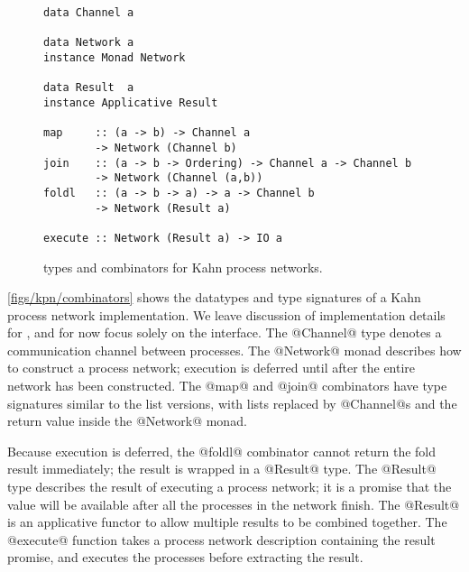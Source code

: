 \begin{figure}
\begin{lstlisting}
data Channel a

data Network a
instance Monad Network

data Result  a
instance Applicative Result

map     :: (a -> b) -> Channel a
        -> Network (Channel b)
join    :: (a -> b -> Ordering) -> Channel a -> Channel b
        -> Network (Channel (a,b))
foldl   :: (a -> b -> a) -> a -> Channel b
        -> Network (Result a)

execute :: Network (Result a) -> IO a
\end{lstlisting}
\caption[Types and combinators for Kahn process networks]{types and combinators for Kahn process networks.}
\label{figs/kpn/combinators}
\end{figure}

\autoref{figs/kpn/combinators} shows the datatypes and type signatures of a Kahn process network implementation.
We leave discussion of implementation details for , and for now focus solely on the interface.
The @Channel@ type denotes a communication channel between processes.
The @Network@ monad describes how to construct a process network; execution is deferred until after the entire network has been constructed.
The @map@ and @join@ combinators have type signatures similar to the list versions, with lists replaced by @Channel@s and the return value inside the @Network@ monad.

Because execution is deferred, the @foldl@ combinator cannot return the fold result immediately; the result is wrapped in a @Result@ type.
The @Result@ type describes the result of executing a process network; it is a promise that the value will be available after all the processes in the network finish.
The @Result@ is an applicative functor to allow multiple results to be combined together.
The @execute@ function takes a process network description containing the result promise, and executes the processes before extracting the result.



